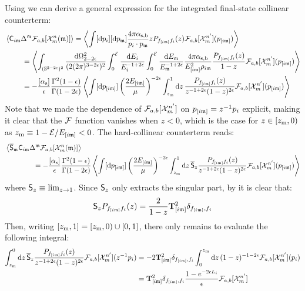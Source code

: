 Using  we can derive a general expression for the integrated final-state collinear counterterm:
\begin{equation*}
  \begin{split}
    & \left\langle \mathsf{C}_{i\mathfrak{m}} \Delta^{\mathfrak{m}} \mathcal{F}_{a,b}[\mathcal{X}^{n}_{m}(\mathfrak{m})] \right\rangle = \left\langle \int [\mathrm{d} p_i] [\mathrm{d} p_{\mathfrak{m}}] \frac{4\pi \alpha_\text{s,b}}{p_i \cdot p_{\mathfrak{m}}} z P_{f_{[i\mathfrak{m}]} f_i}(z) \mathcal{F}_{a,b}[\mathcal{X}^{n'}_{m}](p_{[i\mathfrak{m}]}) \right\rangle \\
    & \qquad \ = \left\langle \int_{(\mathbb{S}^{2-2\epsilon})^2} \frac{\mathrm{d} \Omega_{2-2\epsilon}^2}{(2(2\pi)^{3-2\epsilon})^2} \int_0^{\mathcal{E}} \frac{\mathrm{d} E_i}{E_i^{-1+2\epsilon}} \int_0^{\mathcal{E}} \frac{\mathrm{d} E_{\mathfrak{m}}}{E_{\mathfrak{m}}^{-1+2\epsilon}} \frac{4\pi \alpha_\text{s,b}}{E_{[i\mathfrak{m}]}^2 \rho_{i\mathfrak{m}}} \frac{P_{f_{[i\mathfrak{m}]} f_i}(z)}{1-z} \mathcal{F}_{a,b}[\mathcal{X}^{n'}_{m}](p_{[i\mathfrak{m}]}) \right\rangle \\
    & \qquad \ = - \frac{[\alpha_\text{s}]}{\epsilon} \frac{\Gamma^2(1-\epsilon)}{\Gamma(1-2\epsilon)} \left\langle \int [\mathrm{d} p_{[i\mathfrak{m}]}] \left( \frac{2E_{[i\mathfrak{m}]}}{\mu} \right)^{-2\epsilon} \int_{z_\text{m}}^1 \mathrm{d} z\, \frac{P_{f_{[i\mathfrak{m}]} f_i}(z)}{z^{-1 + 2\epsilon} (1-z)^{2\epsilon}} \mathcal{F}_{a,b}[\mathcal{X}^{n'}_{m}](p_{[i\mathfrak{m}]}) \right\rangle
  \end{split}
\end{equation*}
Note that we made the dependence of $ \mathcal{F}_{a,b}[\mathcal{X}^{n'}_{m}] $ on $ p_{[i\mathfrak{m}]} = z^{-1} p_i $ explicit, making it clear that the $ \mathcal{F} $ function vanishes when $ z < 0 $, which is the case for $ z \in [z_\text{m},0) $ as $ z_\text{m} \equiv 1 - \mathcal{E} / E_{[i\mathfrak{m}]} < 0 $. The hard-collinear counterterm reads:
\begin{equation*}
  \begin{split}
    & \left\langle \overline{\mathsf{S}}_{\mathfrak{m}} \mathsf{C}_{i\mathfrak{m}} \Delta^{\mathfrak{m}} \mathcal{F}_{a,b}[\mathcal{X}^{n}_{m}(\mathfrak{m})] \right\rangle \\
    & \qquad \qquad = - \frac{[\alpha_\text{s}]}{\epsilon} \frac{\Gamma^2(1-\epsilon)}{\Gamma(1-2\epsilon)} \left\langle \int [\mathrm{d} p_{[i\mathfrak{m}]}] \left( \frac{2E_{[i\mathfrak{m}]}}{\mu} \right)^{-2\epsilon} \int_{z_\text{m}}^1 \mathrm{d} z\, \overline{\mathsf{S}}_z \frac{P_{f_{[i\mathfrak{m}]} f_i}(z)}{z^{-1 + 2\epsilon} (1-z)^{2\epsilon}} \mathcal{F}_{a,b}[\mathcal{X}^{n'}_{m}](p_{[i\mathfrak{m}]}) \right\rangle
  \end{split}
\end{equation*}
where $ \mathsf{S}_z \equiv \lim_{z \rightarrow 1} $. Since $ \mathsf{S}_z $ only extracts the singular part, by  it is clear that:
\begin{equation}
  \mathsf{S}_z P_{f_{[i\mathfrak{m}]}f_i}(z) = \frac{2}{1 - z} \mathbf{T}^2_{[i\mathfrak{m}]} \delta_{f_{[i\mathfrak{m}]},f_i}
\end{equation}
Then, writing $ [z_\text{m},1] = [z_\text{m},0) \cup [0,1] $, there only remains to evaluate the following integral:
\begin{equation*}
  \begin{split}
    \int_{z_\text{m}}^0 \mathrm{d} z\, \overline{\mathsf{S}}_z  \frac{P_{f_{[i\mathfrak{m}]}f_i}(z)}{z^{-1+2\epsilon} (1-z)^{2\epsilon}} \mathcal{F}_{a,b}[\mathcal{X}^{n'}_{m}](z^{-1}p_i)
    & = - 2 \mathbf{T}^2_{[i\mathfrak{m}]} \delta_{f_{[i\mathfrak{m}]},f_i} \int_0^{z_\text{m}} \mathrm{d} z\, (1 - z)^{-1-2\epsilon} \mathcal{F}_{a,b}[\mathcal{X}^{n'}_{m}](p_i) \\
    & = \mathbf{T}^2_{[i\mathfrak{m}]} \delta_{f_{[i\mathfrak{m}]},f_i} \frac{1 - e^{-2 \epsilon L_i}}{\epsilon} \mathcal{F}_{a,b}[\mathcal{X}^{n'}_{m}]
  \end{split}
\end{equation*}
